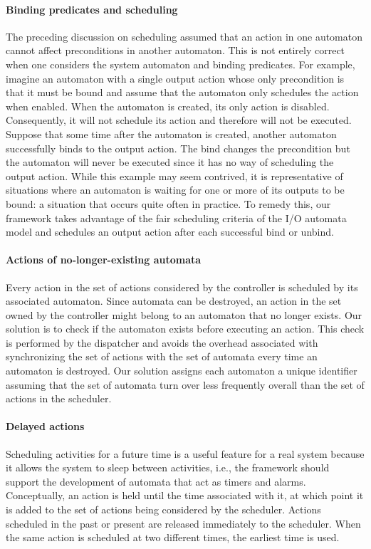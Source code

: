\paragraph*{Binding predicates and scheduling}
The preceding discussion on scheduling assumed that an action in one automaton cannot affect preconditions in another automaton.
This is not entirely correct when one considers the system automaton and binding predicates.
For example, imagine an automaton with a single output action whose only precondition is that it must be bound and assume that the automaton only schedules the action when enabled.
When the automaton is created, its only action is disabled.
Consequently, it will not schedule its action and therefore will not be executed.
Suppose that some time after the automaton is created, another automaton successfully binds to the output action.
The bind changes the precondition but the automaton will never be executed since it has no way of scheduling the output action.
While this example may seem contrived, it is representative of situations where an automaton is waiting for one or more of its outputs to be bound: a situation that occurs quite often in practice.
To remedy this, our framework takes advantage of the fair scheduling criteria of the I/O automata model and schedules an output action after each successful bind or unbind.

\paragraph*{Actions of no-longer-existing automata}
Every action in the set of actions considered by the controller is scheduled by its associated automaton.
Since automata can be destroyed, an action in the set owned by the controller might belong to an automaton that no longer exists.
Our solution is to check if the automaton exists before executing an action.
This check is performed by the dispatcher and avoids the overhead associated with synchronizing the set of actions with the set of automata every time an automaton is destroyed.
Our solution assigns each automaton a unique identifier assuming that the set of automata turn over less frequently overall than the set of actions in the scheduler.

\paragraph*{Delayed actions}
Scheduling activities for a future time is a useful feature for a real system because it allows the system to sleep between activities, i.e., the framework should support the development of automata that act as timers and alarms.
Conceptually, an action is held until the time associated with it, at which point it is added to the set of actions being considered by the scheduler.
Actions scheduled in the past or present are released immediately to the scheduler.
When the same action is scheduled at two different times, the earliest time is used.

